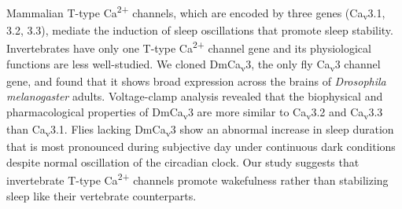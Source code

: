 Mammalian T-type Ca\textsuperscript{2+} channels, which are encoded by three genes (Ca\textsubscript{v}3.1, 3.2, 3.3), mediate the induction of sleep oscillations that promote sleep stability.
Invertebrates have only one T-type Ca\textsuperscript{2+} channel gene and its physiological functions are less well-studied.
We cloned DmCa\textsubscript{v}3, the only fly Ca\textsubscript{v}3 channel gene, and found that it shows broad expression across the brains of \emph{Drosophila melanogaster} adults.
Voltage-clamp analysis revealed that the biophysical and pharmacological properties of DmCa\textsubscript{v}3 are more similar to Ca\textsubscript{v}3.2 and Ca\textsubscript{v}3.3 than Ca\textsubscript{v}3.1.
Flies lacking DmCa\textsubscript{v}3 show an abnormal increase in sleep duration that is most pronounced during subjective day under continuous dark conditions despite normal oscillation of the circadian clock.
Our study suggests that invertebrate T-type Ca\textsuperscript{2+} channels promote wakefulness rather than stabilizing sleep like their vertebrate counterparts.